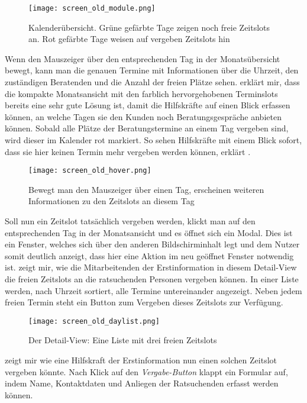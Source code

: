 \begin{figure}[H]
    \caption{Kalenderübersicht. Grüne gefärbte Tage zeigen noch freie Zeitslots an. Rot gefärbte Tage weisen auf vergeben Zeitslots hin}
    \centering
    \texttt{[image: screen\_old\_module.png]}
\end{figure}

Wenn \ipName den Mauszeiger über den entsprechenden Tag in der Monatsübersicht
bewegt, kann man die genauen Termine mit Informationen über die Uhrzeit, den
zuständigen Beratenden und die Anzahl der freien Plätze sehen. \ipName erklärt
mir, dass die kompakte Monatsansicht mit den farblich hervorgehobenen
Terminslots bereits eine sehr gute Lösung ist, damit die Hilfskräfte auf einen
Blick erfassen können, an welche Tagen sie den Kunden noch Beratungsgespräche
anbieten können. Sobald alle Plätze der Beratungstermine an einem Tag vergeben
sind, wird dieser im Kalender rot markiert. \glqq{}So sehen Hilfskräfte mit
einem Blick sofort, dass sie hier keinen Termin mehr vergeben werden
können\grqq{}, erklärt \ipName \cite{claves}.

\begin{figure}[H]
    \caption{Bewegt man den Mauszeiger über einen Tag, erscheinen weiteren Informationen zu den Zeitslots an diesem Tag}
    \centering
    \texttt{[image: screen\_old\_hover.png]}
\end{figure}

Soll nun ein Zeitslot tatsächlich vergeben werden, klickt man auf den
entsprechenden Tag in der Monatsansicht und es öffnet sich ein \gls{Modal}.
Dies ist ein Fenster, welches sich über den anderen Bildschirminhalt legt und
dem Nutzer somit deutlich anzeigt, dass hier eine Aktion im neu geöffnet
Fenster notwendig ist. \ipName zeigt mir, wie die Mitarbeitenden der
Erstinformation in diesem Detail-\gls{View} die freien Zeitslots an die
ratsuchenden Personen vergeben können. In einer Liste werden, nach Uhrzeit
sortiert, alle Termine untereinander angezeigt. Neben jedem freien Termin steht
ein Button zum Vergeben dieses Zeitslots zur Verfügung.

\begin{figure}[H]
    \caption{Der Detail-View: Eine Liste mit drei freien Zeitslots}
    \centering
    \texttt{[image: screen\_old\_daylist.png]}
\end{figure}

\ipName zeigt mir wie eine Hilfskraft der Erstinformation nun einen solchen
Zeitslot vergeben könnte. Nach Klick auf den \textit{Vergabe-Button} klappt ein
Formular auf, indem Name, Kontaktdaten und Anliegen der Ratsuchenden erfasst
werden können.

